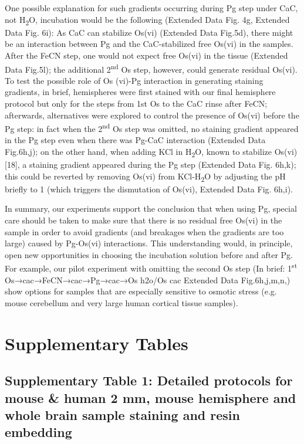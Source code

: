 \documentclass{article}
\begin{document}
One possible explanation for such gradients occurring during Pg step under CaC, not H\textsubscript{2}O, incubation would be the following (Extended Data Fig. 4g, Extended Data Fig. 6i): As CaC can stabilize Os(vi) (Extended Data Fig.5d), there might be an interaction between Pg and the CaC-stabilized free Os(vi) in the samples. After the FeCN step, one would not expect free Os(vi) in the tissue (Extended Data Fig.5l); the additional 2\textsuperscript{nd} Os step, however, could generate residual Os(vi). To test the possible role of Os (vi)-Pg interaction in generating staining gradients, in brief, hemispheres were first stained with our final hemisphere protocol but only for the steps from 1st Os to the CaC rinse after FeCN; afterwards, alternatives were explored to control the presence of Os(vi) before the Pg step: in fact when the 2\textsuperscript{nd} Os step was omitted, no staining gradient appeared in the Pg step even when there was Pg-CaC interaction (Extended Data Fig.6h,j); on the other hand, when adding KCl in H\textsubscript{2}O, known to  stabilize Os(vi) [18], a staining gradient appeared during the Pg step (Extended Data Fig. 6h,k); this could be reverted by removing Os(vi) from KCl-H\textsubscript{2}O by adjusting the pH briefly to 1 (which triggers the dismutation of Os(vi),  Extended Data Fig. 6h,i). 

In summary, our experiments support the conclusion that when using Pg, special care should be taken to make sure that there is no residual free Os(vi) in the sample in order to avoid gradients (and breakages when the gradients are too large) caused by Pg-Os(vi) interactions. This understanding would, in principle, open new opportunities in choosing the incubation solution before and after Pg. For example, our pilot experiment with omitting the second Os step (In brief: 1\textsuperscript{st} Os→cac→FeCN→cac→Pg→cac→Os h2o/Os cac Extended Data Fig.6h,j,m,n,) show options for samples that are especially sensitive to osmotic stress (e.g. mouse cerebellum and very large human cortical tissue samples).  

\section*{Supplementary Tables}


\subsection*{Supplementary Table 1: Detailed protocols for mouse \& human 2 mm, mouse hemisphere and whole brain sample staining and resin embedding}
\end{document}
